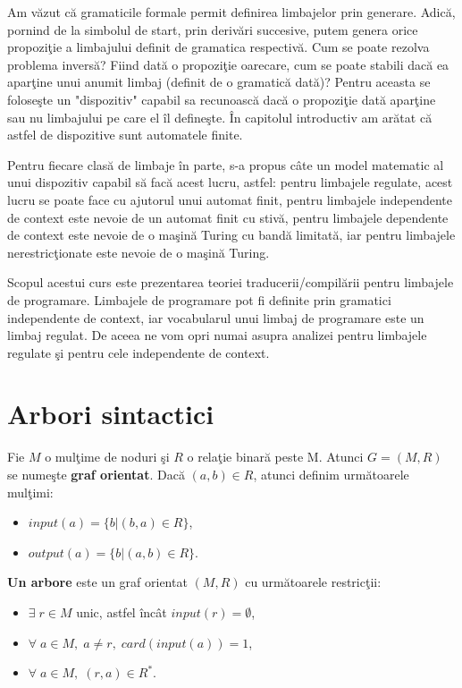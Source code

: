 Am văzut că gramaticile formale permit definirea limbajelor prin generare. Adică, pornind de la simbolul de start, prin derivări succesive, putem genera orice propoziţie a limbajului definit de gramatica respectivă. Cum se poate rezolva problema inversă? Fiind dată o propoziţie oarecare, cum se poate stabili dacă ea aparţine unui anumit limbaj (definit de o gramatică dată)? Pentru aceasta se foloseşte un "dispozitiv" capabil sa recunoască dacă o propoziţie dată aparţine sau nu limbajului pe care el îl defineşte. În capitolul introductiv am arătat că astfel de dispozitive sunt automatele finite. 

Pentru fiecare clasă de limbaje în parte, s-a propus câte un model matematic al unui dispozitiv capabil să facă acest lucru, astfel: pentru limbajele regulate, acest lucru se poate face cu ajutorul unui automat finit, pentru limbajele independente de context este nevoie de un automat finit cu stivă, pentru limbajele dependente de context este nevoie de o maşină Turing cu bandă limitată, iar pentru limbajele nerestricţionate este nevoie de o maşină Turing.

Scopul acestui curs este prezentarea teoriei traducerii/compilării pentru limbajele de programare. Limbajele de programare pot fi definite prin gramatici independente de context, iar vocabularul unui limbaj de programare este un limbaj regulat. De aceea ne vom opri numai asupra analizei pentru limbajele regulate şi pentru cele independente de context.

\section{Arbori sintactici}

Fie $M$ o mulţime de noduri şi $R$ o relaţie binară peste M. Atunci $G=(M, R)$ se numeşte \textbf{graf orientat}. Dacă $(a, b) \in R$, atunci definim următoarele mulţimi:
\begin{itemize}
\item
$input(a) = \{ b | (b, a) \in R \}$,
\item
$output(a) = \{ b | (a, b) \in R \}$.
\end{itemize}

\textbf{Un arbore} este un graf orientat $(M, R)$ cu următoarele restricţii:
\begin{itemize}
\item
$\exists \; r \in M$ unic, astfel încât $input(r) = \emptyset$,
\item
$\forall \; a \in M, \; a \neq r, \; card(input(a)) = 1$,
\item
$\forall \; a \in M, \; (r, a) \in R^{*}$.
\end{itemize}

